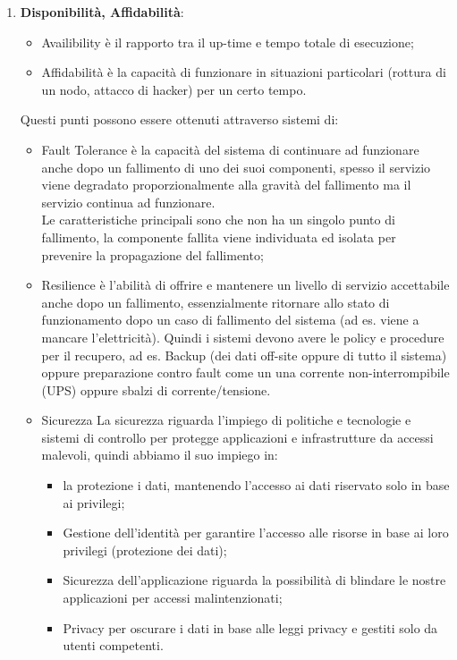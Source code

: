 \documentclass[11pt, twocolumn]{article}
\begin{document}
\begin{enumerate}[noitemsep, topsep=0ex, leftmargin=*]
	\item \textbf{Disponibilità, Affidabilità}:
	\begin{itemize}[noitemsep, topsep=0ex, leftmargin=*]
		\item Availibility è il rapporto tra il up-time e tempo totale di esecuzione;
		\item Affidabilità è la capacità di funzionare in situazioni particolari (rottura di un nodo, attacco di hacker) per un certo tempo.
	\end{itemize}
	Questi punti possono essere ottenuti attraverso sistemi di:
	\begin{itemize}[noitemsep, topsep=0ex, leftmargin=*]
		\item Fault Tolerance è la capacità del sistema di continuare ad funzionare anche dopo un fallimento di uno dei suoi componenti, spesso il servizio viene degradato proporzionalmente alla gravità del fallimento ma il servizio continua ad funzionare.\\
		Le caratteristiche principali sono che non ha un singolo punto di fallimento, la componente fallita viene individuata ed isolata per prevenire la propagazione del fallimento;
		\item Resilience è l'abilità di offrire e mantenere un livello di servizio accettabile anche dopo un fallimento, essenzialmente ritornare allo stato di funzionamento dopo un caso di fallimento del sistema (ad es. viene a mancare l'elettricità).
		Quindi i sistemi devono avere le policy e procedure per il recupero, ad es. Backup (dei dati off-site oppure di tutto il sistema) oppure preparazione contro fault come un una corrente non-interrompibile (UPS) oppure sbalzi di corrente/tensione.
		\item Sicurezza
		La sicurezza riguarda l'impiego di politiche e tecnologie e sistemi di controllo per protegge applicazioni e infrastrutture da accessi malevoli, quindi abbiamo il suo impiego in:
		\begin{itemize}[noitemsep, topsep=0ex, leftmargin=*]
			\item la protezione i dati, mantenendo l'accesso ai dati riservato solo in base ai privilegi;
			\item Gestione dell'identità per garantire l'accesso alle risorse in base ai loro privilegi (protezione dei dati);
			\item Sicurezza dell'applicazione riguarda la possibilità di blindare le nostre applicazioni per accessi malintenzionati;
			\item Privacy per oscurare i dati in base alle leggi privacy e gestiti solo da utenti competenti.
		\end{itemize}
	\end{itemize}


\end{enumerate}
\end{document}
